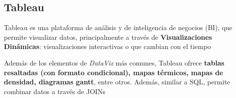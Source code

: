 \subsection{Tableau}
Tableau es una plataforma de análisis y de inteligencia de negocios (BI), que permite visualizar datos, principalmente a través de \textbf{Visualizaciones Dinámicas}: visualizaciones interactivas o que cambian con el tiempo

Además de los elementos de \textit{DataViz} más comunes, Tableau ofrece \textbf{tablas resaltadas (con formato condicional), mapas térmicos, mapas de densidad, diagramas gantt}, entre otros. Además, similar a SQL, permite combinar datos a través de JOINs

\newpage